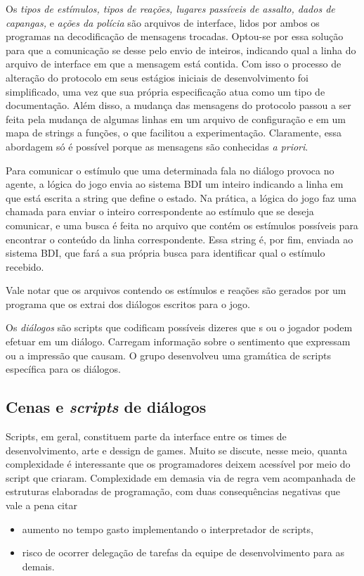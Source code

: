 Os \emph{tipos de estímulos, tipos de reações, lugares passíveis de assalto, dados de capangas,} e \emph{ações da polícia} são arquivos de interface, lidos por ambos os programas na decodificação de mensagens trocadas. Optou-se por essa solução para que a comunicação se desse pelo envio de inteiros, indicando qual a linha do arquivo de interface
em que a mensagem está contida. Com isso o processo de alteração do protocolo em seus estágios iniciais de desenvolvimento foi simplificado, uma vez que sua própria especificação atua como um tipo de documentação. Além disso, a mudança das mensagens do protocolo passou a ser feita pela mudança de algumas linhas em um arquivo de configuração e em um mapa de strings a funções, o que facilitou a experimentação. Claramente, essa abordagem só é
possível porque as mensagens são conhecidas \emph{a priori}.

Para comunicar o estímulo que uma determinada fala no diálogo provoca
no agente, a lógica do jogo envia ao sistema BDI um inteiro indicando
a linha em que está escrita a string que define o estado. Na prática,
a lógica do jogo faz uma chamada para enviar o inteiro correspondente
ao estímulo que se deseja comunicar, e uma busca é feita no arquivo
que contém os estímulos possíveis para encontrar o conteúdo da linha
correspondente. Essa string é, por fim, enviada ao sistema BDI, que
fará a sua própria busca para identificar qual o estímulo recebido.

Vale notar que os arquivos contendo os estímulos e reações são gerados por um programa que os extrai dos diálogos escritos para o jogo.

Os \emph{diálogos} são scripts que codificam possíveis dizeres que
\npc{}s ou o jogador podem efetuar em um diálogo. Carregam informação sobre
o sentimento que expressam ou a impressão que causam. 
O grupo desenvolveu uma gramática de scripts específica para os diálogos.

\subsection{Cenas e \emph{scripts} de diálogos}
Scripts, em geral, constituem parte da interface entre os times de
desenvolvimento, arte e dessign de games. Muito se discute, nesse
meio, quanta complexidade é interessante que os programadores deixem
acessível por meio do script que criaram. Complexidade em demasia via
de regra vem acompanhada de estruturas elaboradas de programação, com
duas consequências negativas que vale a pena citar
\begin{itemize}
\item aumento no tempo gasto implementando o interpretador de scripts,
\item risco de ocorrer delegação de tarefas da equipe de
  desenvolvimento para as demais.
\end{itemize}

